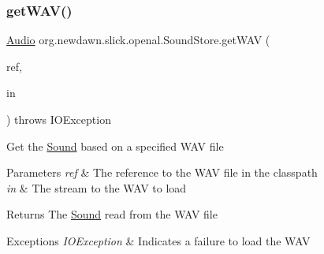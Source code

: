 \subsubsection{\texorpdfstring{get\+W\+A\+V()}{getWAV()}\hspace{0.1cm}{\footnotesize\ttfamily [3/3]}}
{\footnotesize\ttfamily \mbox{\hyperlink{interfaceorg_1_1newdawn_1_1slick_1_1openal_1_1_audio}{Audio}} org.\+newdawn.\+slick.\+openal.\+Sound\+Store.\+get\+W\+AV (\begin{DoxyParamCaption}\item[{String}]{ref,  }\item[{Input\+Stream}]{in }\end{DoxyParamCaption}) throws I\+O\+Exception\hspace{0.3cm}{\ttfamily [inline]}}

Get the \mbox{\hyperlink{classorg_1_1newdawn_1_1slick_1_1_sound}{Sound}} based on a specified W\+AV file


\begin{DoxyParams}{Parameters}
{\em ref} & The reference to the W\+AV file in the classpath \\
\hline
{\em in} & The stream to the W\+AV to load \\
\hline
\end{DoxyParams}
\begin{DoxyReturn}{Returns}
The \mbox{\hyperlink{classorg_1_1newdawn_1_1slick_1_1_sound}{Sound}} read from the W\+AV file 
\end{DoxyReturn}

\begin{DoxyExceptions}{Exceptions}
{\em I\+O\+Exception} & Indicates a failure to load the W\+AV \\
\hline
\end{DoxyExceptions}


